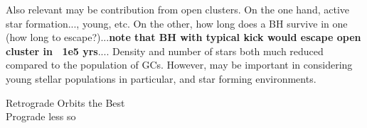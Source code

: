 Also relevant may be contribution from open clusters.  On the one hand, active star formation..., young, etc.  On the other, how long does a BH survive in one (how long to escape?)...{\bf note that BH with typical kick would escape open cluster in ~1e5 yrs}....  Density and number of stars both much reduced compared to the population of GCs.  However, may be important in considering young stellar populations in particular, and star forming environments.





Retrograde Orbits the Best\\
Prograde less so
